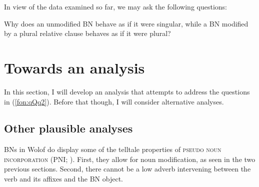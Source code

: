 \documentclass[output=paper]{langscibook}
\begin{document}
	\label{fon:bnPlayNReSiPrr}
	\z
	
	\label{fon:bnPlayNReSiPrr444}
	\z
	
		
\noindent In view of the data examined so far, we may ask the following questions:


	\eanoraggedright \label{fon:qQq2}
	    \eanoraggedright Why does an unmodified BN behave as if it were singular, while a BN modified by a plural relative clause behaves as if it were plural?
	\z
	\z

\section{Towards an analysis}
\label{fon:sec:analysis}

In this section, I will develop an analysis that attempts to address the questions in (\ref{fon:qQq2}). Before that though, I will consider alternative analyses.

\subsection{Other plausible analyses}

BNs in Wolof do display some of the telltale properties of \textsc{pseudo noun incorporation} (PNI; \citealt{massam2001pseudo,dayal2011hindi,baker2014pseudo}). First, they allow for noun modification, as seen in the two previous sections. Second, there cannot be a low adverb intervening between the verb and its affixes and the BN object.
		
			\ea
					\label{fon:laUdPoeMm1}
					\label{fon:laUdPoeMm2}
			\z\label{fon:laUdPoeMm}
		\z
\end{document}
